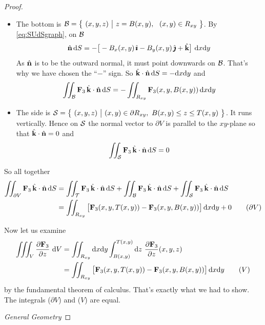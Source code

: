 \begin{proof}
\begin{itemize}
\item[$\circ$]
The bottom is 
$\mathcal{B}=\big\{ \ (x,y,z)\ \big|\  z= B(x,y),\ \ (x,y)\in R_{xy}\ \big\}$.
By \eqref{eq:SUdSgraph}, on $\mathcal{B}$
\begin{equation*}
\hn\, \dee{S}  = -\big[-B_x(x,y)\,\hi - B_y(x,y)\,\hj + \hk\big]\ 
          \dee{x}\dee{y}
\end{equation*}
As $\hat{\mathbf{n}}$ is to be the outward normal, it must point downwards on $\mathcal{B}$.
That's why we have chosen the ``$-$'' sign. So $\hat{\mathbf{k}}\cdot\hat{\mathbf{n}}\,\mathrm{d}S = 
-\mathrm{d}x\mathrm{d}y$ and
\begin{equation*}
\iint_{\mathcal{B}}  \mathbf{F}_3\,\hat{\mathbf{k}} \cdot\hat{\mathbf{n}}\,\mathrm{d}S
=-\iint_{R_{xy}}  \mathbf{F}_3(x,y,B(x,y))\,\mathrm{d}x\mathrm{d}y
\end{equation*}

\item[$\circ$]
The side is $\cS=\Set{(x,y,z)}{(x,y)\in\partial R_{xy},\ B(x,y)\le z\le T(x,y)}$. It runs vertically. Hence on  $\mathcal{S}$ the normal vector to $\partial V$ 
is parallel to the $xy$-plane so that $\hat{\mathbf{k}}\cdot\hat{\mathbf{n}}=0$ and
\begin{equation*}
\iint_{\mathcal{S}}  \mathbf{F}_3\,\hat{\mathbf{k}} \cdot\hat{\mathbf{n}}\,\mathrm{d}S = 0
\end{equation*}
\end{itemize}

So all together
\begin{align}
\iint_{\partial V}  \mathbf{F}_3\,\hat{\mathbf{k}} \cdot\hat{\mathbf{n}}\,\mathrm{d}S
&=\iint_{\mathcal{T}}  \mathbf{F}_3\,\hat{\mathbf{k}} \cdot\hat{\mathbf{n}}\,\mathrm{d}S
 +\iint_{\mathcal{B}}  \mathbf{F}_3\,\hat{\mathbf{k}} \cdot\hat{\mathbf{n}}\,\mathrm{d}S
 +\iint_{\mathcal{S}}  \mathbf{F}_3\,\hat{\mathbf{k}} \cdot\hat{\mathbf{n}}\,\mathrm{d}S \notag\\
&=\iint_{R_{xy}}  \big[\mathbf{F}_3(x,y,T(x,y))
   -\mathbf{F}_3(x,y,B(x,y))\big]\,\mathrm{d}x\mathrm{d}y
   +0
\tag{$\partial V$}
\end{align}

Now let us examine
\begin{align}
\tripInt_V\frac{\partial \vF_3}{\partial z}\ \dee{V} 
&= \dblInt_{R_{xy}}\dee{x}\dee{y}\int_{B(x,y)}^{T(x,y)}\dee{z}\ 
            \frac{\partial \vF_3}{\partial z}(x,y,z) \notag\\
&=\dblInt_{R_{xy}}  \big[\vF_3(x,y,T(x,y))
   -\vF_3(x,y,B(x,y))\big]\,\dee{x}\dee{y}
\tag{$V$}
\end{align}
by the fundamental theorem of calculus.
That's exactly what we had to show. The integrals ($\partial V$)
and ($V$) are equal.


\medskip
\noindent \emph{General Geometry}


\end{proof}
